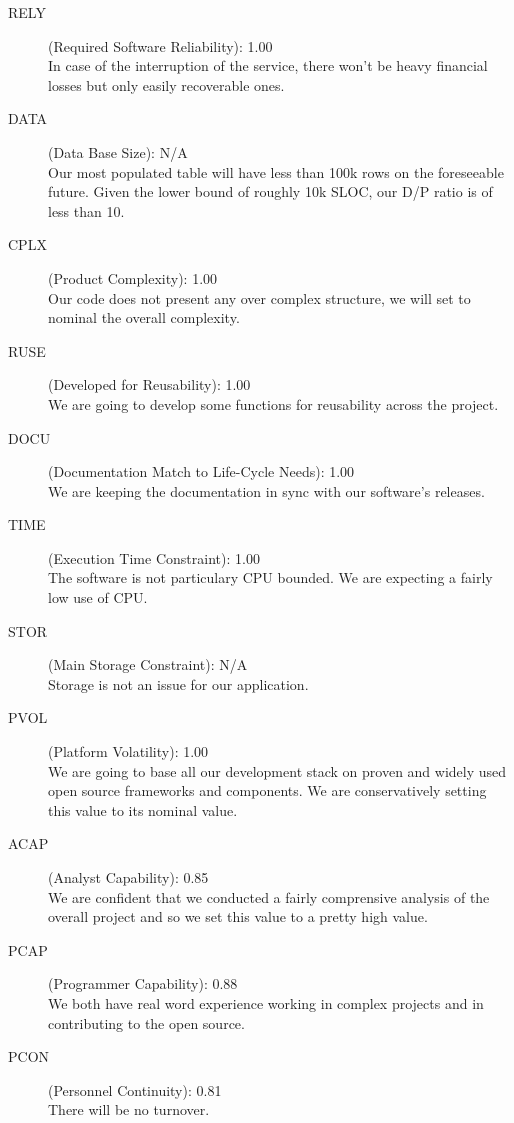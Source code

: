 \documentclass[11pt]{article} %
\begin{document}
\begin{description}
	\item[RELY] (Required Software Reliability): {\large 1.00} \\ In case of the interruption of the service, there won't be heavy financial losses but only easily recoverable ones.
	\item[DATA] (Data Base Size): {\large N/A} \\ Our most populated table will have less than 100k rows on the foreseeable future. Given the lower bound of roughly 10k SLOC, our D/P ratio is of less than 10.
	\item[CPLX] (Product Complexity): {\large 1.00} \\ Our code does not present any over complex structure, we will set to nominal the overall complexity.
	\item[RUSE] (Developed for Reusability): {\large 1.00} \\ We are going to develop some functions for reusability across the project.
	\item[DOCU] (Documentation Match to Life-Cycle Needs): {\large 1.00} \\ We are keeping the documentation in sync with our software's releases.
	\item [TIME] (Execution Time Constraint): {\large 1.00} \\  The software is not particulary CPU bounded. We are expecting a fairly low use of CPU.
	\item[STOR] (Main Storage Constraint): {\large N/A} \\  Storage is not an issue for our application.
	\item[PVOL] (Platform Volatility): {\large 1.00} \\  We are going to base all our development stack on proven and widely used open source frameworks and components. We are conservatively setting this value to its nominal value.
	\item[ACAP] (Analyst Capability): {\large 0.85} \\  We are confident that we conducted a fairly comprensive analysis of the overall project and so we set this value to a pretty high value.
	\item[PCAP] (Programmer Capability): {\large 0.88} \\  We both have real word experience working in complex projects and in contributing to the open source.
	\item[PCON] (Personnel Continuity): {\large 0.81} \\  There will be no turnover.

\end{description}
\end{document}
